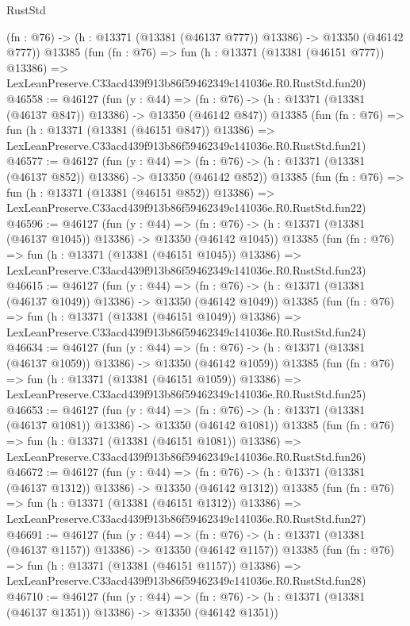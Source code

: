 \begin{lexlean}{RustStd}
\begin{coremodule}
    (fn : @76) -> (h : @13371 (@13381 (@46137 @777)) @13386) -> @13350 (@46142 @777))
    @13385
    (fun (fn : @76) =>
    fun (h : @13371 (@13381 (@46151 @777)) @13386) =>
    LexLeanPreserve.C33acd439f913b86f59462349c141036e.R0.RustStd.fun20)
@46558 := @46127
    (fun (y : @44) =>
    (fn : @76) -> (h : @13371 (@13381 (@46137 @847)) @13386) -> @13350 (@46142 @847))
    @13385
    (fun (fn : @76) =>
    fun (h : @13371 (@13381 (@46151 @847)) @13386) =>
    LexLeanPreserve.C33acd439f913b86f59462349c141036e.R0.RustStd.fun21)
@46577 := @46127
    (fun (y : @44) =>
    (fn : @76) -> (h : @13371 (@13381 (@46137 @852)) @13386) -> @13350 (@46142 @852))
    @13385
    (fun (fn : @76) =>
    fun (h : @13371 (@13381 (@46151 @852)) @13386) =>
    LexLeanPreserve.C33acd439f913b86f59462349c141036e.R0.RustStd.fun22)
@46596 := @46127
    (fun (y : @44) =>
    (fn : @76) -> (h : @13371 (@13381 (@46137 @1045)) @13386) -> @13350 (@46142 @1045))
    @13385
    (fun (fn : @76) =>
    fun (h : @13371 (@13381 (@46151 @1045)) @13386) =>
    LexLeanPreserve.C33acd439f913b86f59462349c141036e.R0.RustStd.fun23)
@46615 := @46127
    (fun (y : @44) =>
    (fn : @76) -> (h : @13371 (@13381 (@46137 @1049)) @13386) -> @13350 (@46142 @1049))
    @13385
    (fun (fn : @76) =>
    fun (h : @13371 (@13381 (@46151 @1049)) @13386) =>
    LexLeanPreserve.C33acd439f913b86f59462349c141036e.R0.RustStd.fun24)
@46634 := @46127
    (fun (y : @44) =>
    (fn : @76) -> (h : @13371 (@13381 (@46137 @1059)) @13386) -> @13350 (@46142 @1059))
    @13385
    (fun (fn : @76) =>
    fun (h : @13371 (@13381 (@46151 @1059)) @13386) =>
    LexLeanPreserve.C33acd439f913b86f59462349c141036e.R0.RustStd.fun25)
@46653 := @46127
    (fun (y : @44) =>
    (fn : @76) -> (h : @13371 (@13381 (@46137 @1081)) @13386) -> @13350 (@46142 @1081))
    @13385
    (fun (fn : @76) =>
    fun (h : @13371 (@13381 (@46151 @1081)) @13386) =>
    LexLeanPreserve.C33acd439f913b86f59462349c141036e.R0.RustStd.fun26)
@46672 := @46127
    (fun (y : @44) =>
    (fn : @76) -> (h : @13371 (@13381 (@46137 @1312)) @13386) -> @13350 (@46142 @1312))
    @13385
    (fun (fn : @76) =>
    fun (h : @13371 (@13381 (@46151 @1312)) @13386) =>
    LexLeanPreserve.C33acd439f913b86f59462349c141036e.R0.RustStd.fun27)
@46691 := @46127
    (fun (y : @44) =>
    (fn : @76) -> (h : @13371 (@13381 (@46137 @1157)) @13386) -> @13350 (@46142 @1157))
    @13385
    (fun (fn : @76) =>
    fun (h : @13371 (@13381 (@46151 @1157)) @13386) =>
    LexLeanPreserve.C33acd439f913b86f59462349c141036e.R0.RustStd.fun28)
@46710 := @46127
    (fun (y : @44) =>
    (fn : @76) -> (h : @13371 (@13381 (@46137 @1351)) @13386) -> @13350 (@46142 @1351))

\end{coremodule}
\end{lexlean}
